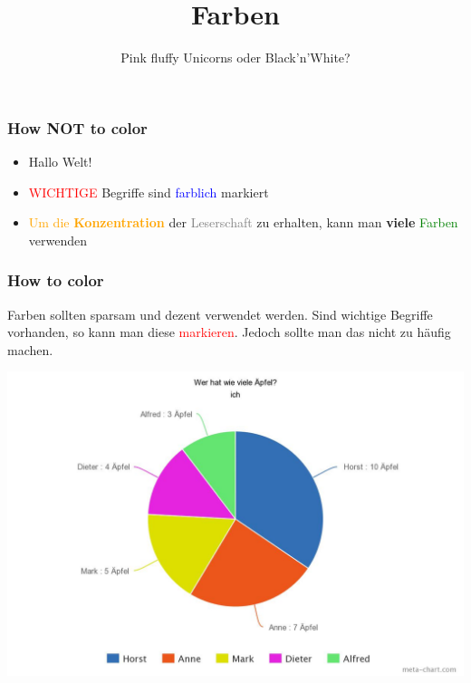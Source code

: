 \documentclass[pdf,tikz]{beamer}
\title{Farben}
\subtitle{Pink fluffy Unicorns oder Black'n'White?}
\begin{document}
\begin{frame}
	\titlepage
\end{frame}


\begingroup
{}
\begin{frame}
\frametitle{\textcolor{porange}{How NOT to color}}
\begin{itemize}
	\item \textcolor{pgreen}{\Large{Hallo Welt!}}
	\item \textcolor{red}{WICHTIGE} Begriffe sind \textcolor{blue}{farblich} markiert
	\item \textcolor{orange}{Um die \textbf{Konzentration}} der \textcolor{gray}{Leserschaft} zu erhalten, kann man \textbf{viele} \textcolor{green}{Farben} verwenden
\end{itemize}
\end{frame}
\endgroup

\begingroup
{}
\begin{frame}
\frametitle{How to color}
\textcolor{pdarkblue}{Farben sollten sparsam und dezent verwendet werden. Sind wichtige Begriffe vorhanden, so kann man diese \textcolor{red}{markieren}. Jedoch sollte man das nicht zu häufig machen.}
\end{frame}
\endgroup

\begin{frame}
\centering
\includegraphics[scale=0.25]{apfelchart}
\end{frame}
\end{document}
